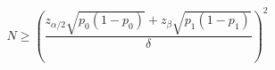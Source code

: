 \documentclass[12pt]{article}
\begin{document}
\pagestyle{empty}
\large

\[
N \ge \left( \frac{z_{\alpha/2} \sqrt{p_0(1 - p_0)} + z_{\beta} \sqrt{p_1(1 - p_1)}} {\delta} \right) ^2
\]
\end{document}
